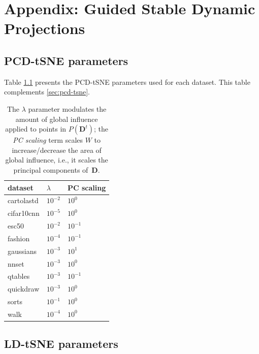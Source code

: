 \chapter{Appendix: Guided Stable Dynamic Projections}
\label{ch:projection-algorithm-appendix}

\section{PCD-tSNE parameters}

Table \ref{tab:pcd-params} presents the PCD-tSNE parameters used for each dataset. This table complements \cref{sec:pcd-tsne}. 

\begin{table}[h!]
  \centering
  \selectfont
  \scriptsize
  \begin{tabular}{|l|l|l|}
  \hline
  {dataset}    & {$\lambda$} & {PC scaling}        \\ \hline
  \hline
  cartolastd & $10^{-2}$ & $10^{0}$  \\ \hline
  cifar10cnn & $10^{-5}$ & $10^{0}$  \\ \hline
  esc50      & $10^{-2}$ & $10^{-1}$ \\ \hline
  fashion    & $10^{-4}$ & $10^{-1}$ \\ \hline
  gaussians  & $10^{-3}$ & $10^{1}$  \\ \hline
  nnset      & $10^{-3}$ & $10^{0}$  \\ \hline
  qtables    & $10^{-3}$ & $10^{-1}$ \\ \hline
  quickdraw  & $10^{-3}$ & $10^{0}$  \\ \hline
  sorts      & $10^{-1}$ & $10^{0}$  \\ \hline
  walk       & $10^{-4}$ & $10^{0}$  \\ \hline
  \end{tabular}
  \caption{The $\lambda$ parameter modulates the amount of global influence applied to points in $P(\mathbf{D}^t)$; the \emph{PC scaling} term scales $W$ to increase/decrease the area of global influence, i.e., it scales the principal components of \,$\mathbf{D}$.}
  \label{tab:pcd-params}
\end{table}

\section{LD-tSNE parameters}

